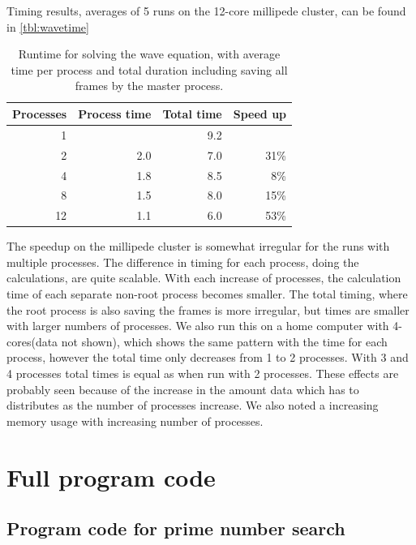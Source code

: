 \documentclass[a4paper]{article}
\begin{document}
Timing results, averages of 5 runs on the 12-core millipede cluster, can be found in \autoref{tbl:wavetime}

\begin{table}[h]
	\centering
	\caption{Runtime for solving the wave equation, with average time per process and total duration including saving all frames by the master process.}
	\label{tbl:wavetime}
	\begin{tabular}{r|r|r|r}
		Processes & Process time & Total time & Speed up \\ \hline
		 1 & & 9.2 & \\
		 2 & 2.0 & 7.0 & 31\% \\
		 4 & 1.8 & 8.5 & 8\% \\
		 8 & 1.5 & 8.0 & 15\% \\
		12 & 1.1 & 6.0 & 53\% 
	\end{tabular}
\end{table}

The speedup on the millipede cluster is somewhat irregular for the runs with multiple processes. The difference in timing for each process, doing the calculations, are quite scalable. With each increase of processes, the calculation time of each separate non-root process becomes smaller. The total timing, where the root process is also saving the frames is more irregular, but times are smaller with larger numbers of processes. We also run this on a home computer with 4-cores(data not shown), which shows the same pattern with the time for each process, however the total time only decreases from 1 to 2 processes. With 3 and 4 processes total times is equal as when run with 2 processes. These effects are probably seen because of the increase in the amount data which has to distributes as the number of processes increase. We also noted a increasing memory usage with increasing number of processes.





\clearpage
\appendix
\section{Full program code}
\subsection{Program code for prime number search}


\end{document}
